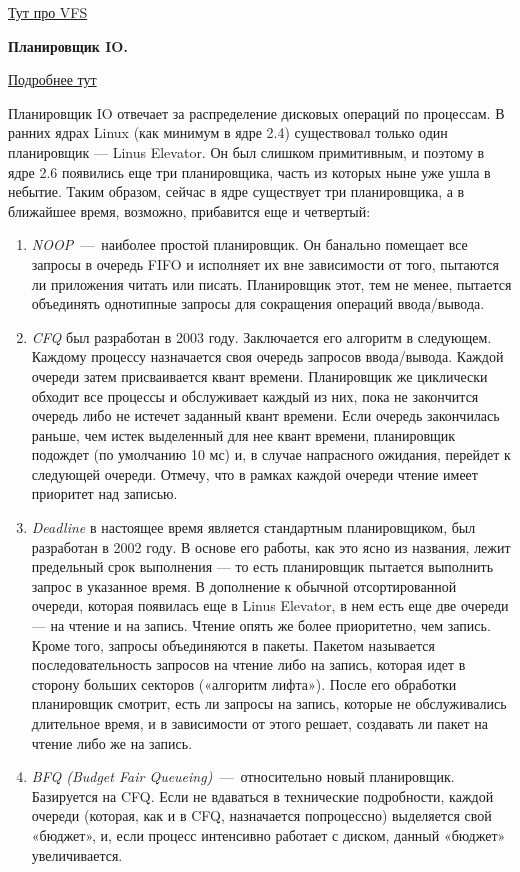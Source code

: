 \documentclass{article}
\begin{document}
\href{https://russianblogs.com/article/825789153/}{Тут про VFS}

\textbf{Планировщик IO.}

\href{https://xakep.ru/2014/05/11/input-out-linux-planning/}{Подробнее тут}

Планировщик IO отвечает за распределение дисковых операций по процессам.  В ранних ядрах Linux (как минимум в ядре 2.4) существовал только один планировщик — Linus Elevator. Он был слишком примитивным, и поэтому в ядре 2.6 появились еще три планировщика, часть из которых ныне уже ушла в небытие. Таким образом, сейчас в ядре существует три планировщика, а в ближайшее время, возможно, прибавится еще и четвертый:
\begin{enumerate}
	\item \emph{NOOP}~---~наиболее простой планировщик. Он банально помещает все запросы в очередь FIFO и исполняет их вне зависимости от того, пытаются ли приложения читать или писать. Планировщик этот, тем не менее, пытается объединять однотипные запросы для сокращения операций ввода/вывода.
	\item \emph{CFQ} был разработан в 2003 году. Заключается его алгоритм в следующем. Каждому процессу назначается своя очередь запросов ввода/вывода. Каждой очереди затем присваивается квант времени. Планировщик же циклически обходит все процессы и обслуживает каждый из них, пока не закончится очередь либо не истечет заданный квант времени. Если очередь закончилась раньше, чем истек выделенный для нее квант времени, планировщик подождет (по умолчанию 10 мс) и, в случае напрасного ожидания, перейдет к следующей очереди. Отмечу, что в рамках каждой очереди чтение имеет приоритет над записью.
	\item \emph{Deadline} в настоящее время является стандартным планировщиком, был разработан в 2002 году. В основе его работы, как это ясно из названия, лежит предельный срок выполнения — то есть планировщик пытается выполнить запрос в указанное время. В дополнение к обычной отсортированной очереди, которая появилась еще в Linus Elevator, в нем есть еще две очереди — на чтение и на запись. Чтение опять же более приоритетно, чем запись. Кроме того, запросы объединяются в пакеты. Пакетом называется последовательность запросов на чтение либо на запись, которая идет в сторону больших секторов («алгоритм лифта»). После его обработки планировщик смотрит, есть ли запросы на запись, которые не обслуживались длительное время, и в зависимости от этого решает, создавать ли пакет на чтение либо же на запись.
	\item \emph{BFQ (Budget Fair Queueing)}~---~относительно новый планировщик. Базируется на CFQ. Если не вдаваться в технические подробности, каждой очереди (которая, как и в CFQ, назначается попроцессно) выделяется свой «бюджет», и, если процесс интенсивно работает с диском, данный «бюджет» увеличивается.
\end{enumerate}
\end{document}
